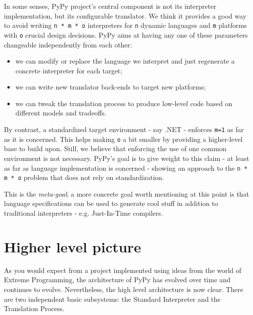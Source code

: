\documentclass[a4paper,11pt,english]{article}
\begin{document}
In some senses, PyPy project's central component is not its
interpreter implementation, but its configurable translator.
We think it provides a good way to avoid writing \texttt{n * m * o}
interpreters for \texttt{n} dynamic languages and \texttt{m} platforms
with \texttt{o} crucial design decisions.  PyPy aims at having any
one of these parameters changeable independently from each other:
\begin{itemize}
\item {} 
we can modify or replace the language we interpret and just regenerate
a concrete interpreter for each target;

\item {} 
we can write new translator back-ends to target new platforms;

\item {} 
we can tweak the translation process to produce low-level code based
on different models and tradeoffs.

\end{itemize}

By contrast, a standardized target environment - say .NET - 
enforces \texttt{m=1} as far as it is concerned.  This helps making \texttt{o} a
bit smaller by providing a higher-level base to build upon.  Still,
we believe that enforcing the use of one common environment 
is not necessary.  PyPy's goal is to give weight to this claim - at least 
as far as language implementation is concerned - showing an approach
to the \texttt{n * m * o} problem that does not rely on standardization.

This is the \emph{meta-goal}; a more concrete goal worth mentioning at this
point is that language specifications can be used to generate cool stuff
in addition to traditional interpreters - e.g. Just-In-Time compilers.



\hypertarget{higher-level-picture}{}
\section{Higher level picture}

As you would expect from a project implemented using ideas from the world
of Extreme Programming\footnotemark[7], the architecture of PyPy has evolved over time
and continues to evolve.  Nevertheless, the high level architecture is now
clear.  There are two independent basic subsystems: the Standard
Interpreter and the Translation Process.
\end{document}
